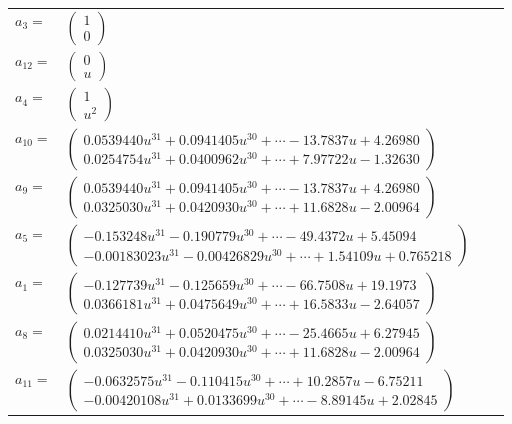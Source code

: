 \documentclass[1p]{elsarticle_modified}
\theoremstyle{definition}
\begin{document}
\begin{tabular}{m{7pt} m{180pt} m{7pt} m{180pt} }
\flushright $a_{3}=$&$\begin{pmatrix}1\\0\end{pmatrix}$ \\
\flushright $a_{12}=$&$\begin{pmatrix}0\\u\end{pmatrix}$ \\
\flushright $a_{4}=$&$\begin{pmatrix}1\\u^2\end{pmatrix}$ \\
\flushright $a_{10}=$&$\begin{pmatrix}0.0539440 u^{31}+0.0941405 u^{30}+\cdots-13.7837 u+4.26980\\0.0254754 u^{31}+0.0400962 u^{30}+\cdots+7.97722 u-1.32630\end{pmatrix}$ \\
\flushright $a_{9}=$&$\begin{pmatrix}0.0539440 u^{31}+0.0941405 u^{30}+\cdots-13.7837 u+4.26980\\0.0325030 u^{31}+0.0420930 u^{30}+\cdots+11.6828 u-2.00964\end{pmatrix}$ \\
\flushright $a_{5}=$&$\begin{pmatrix}-0.153248 u^{31}-0.190779 u^{30}+\cdots-49.4372 u+5.45094\\-0.00183023 u^{31}-0.00426829 u^{30}+\cdots+1.54109 u+0.765218\end{pmatrix}$ \\
\flushright $a_{1}=$&$\begin{pmatrix}-0.127739 u^{31}-0.125659 u^{30}+\cdots-66.7508 u+19.1973\\0.0366181 u^{31}+0.0475649 u^{30}+\cdots+16.5833 u-2.64057\end{pmatrix}$ \\
\flushright $a_{8}=$&$\begin{pmatrix}0.0214410 u^{31}+0.0520475 u^{30}+\cdots-25.4665 u+6.27945\\0.0325030 u^{31}+0.0420930 u^{30}+\cdots+11.6828 u-2.00964\end{pmatrix}$ \\
\flushright $a_{11}=$&$\begin{pmatrix}-0.0632575 u^{31}-0.110415 u^{30}+\cdots+10.2857 u-6.75211\\-0.00420108 u^{31}+0.0133699 u^{30}+\cdots-8.89145 u+2.02845\end{pmatrix}$ \\

\end{tabular}
\end{document}
